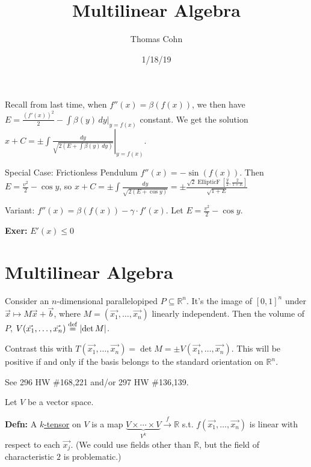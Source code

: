 \documentclass[10pt,letterpaper]{article}
\author{Thomas Cohn}
\title{Multilinear Algebra}
\date{1/18/19} %
\newcommand{\n}{\hfill\break}
\newcommand{\defn}[1]{\par\noindent\settowidth{\hangindent}{\textbf{Defn: }}\textbf{Defn: }#1\n}
\newcommand{\exer}[1]{\par\noindent\settowidth{\hangindent}{\textbf{Exer: }}\textbf{Exer: }#1\n}
\newcommand{\ptxt}[1]{\textrm{\textnormal{#1}}}
\newcommand{\reals}{\mathbb{R}}
\newcommand{\R}{\reals}
\newcommand{\abs}[1]{\left|#1\right|}
\newcommand{\st}{s.t.}
\newcommand{\eqdef}{\overset{\ptxt{def}}{=}}
\renewcommand{\brack}[1]{\left[#1\right]}
\begin{document}
\maketitle
\setlength\RaggedRightParindent{\parindent}
\RaggedRight

\par\noindent Recall from last time, when $f''(x)=\beta(f(x))$, we then have $E=\frac{(f'(x))^{2}}{2}-\int\beta(y)\,dy|_{y=f(x)}$ constant.\n
We get the solution $\displaystyle{}x+C=\left.\pm\int\frac{dy}{\sqrt{2(E+\int\beta(y)\,dy)}}\right|_{y=f(x)}$.\n

\par\noindent Special Case: Frictionless Pendulum\n
$f''(x)=-\sin(f(x))$.\n
Then $E=\frac{v^{2}}{2}-\cos{}y$, so\n
$\displaystyle{}x+C=\pm\int\frac{dy}{\sqrt{2(E+\cos{}y)}}=\pm\frac{\sqrt{2}\operatorname{EllipticF}\brack{\frac{y}{2},\frac{2}{1+E}}}{\sqrt{1+E}}$\n

\par\noindent Variant: $f''(x)=\beta(f(x))-\gamma\cdot{}f'(x)$. Let $E=\frac{v^{2}}{2}-\cos{}y$.\n

\exer{$E'(x)\le{}0$}

\newpage
\section*{Multilinear Algebra}

\par\noindent Consider an $n$-dimensional parallelopiped $P\subseteq\R^{n}$. It's the image of $[0,1]^{n}$ under $\vec{x}\mapsto{}M\vec{x}+\vec{b}$, where $M=(\vec{x_{1}},\ldots,\vec{x_{n}})$ linearly independent. Then the volume of $P$, $V(\vec{x_{1}},\ldots,\vec{x_{n}})\eqdef\abs{\det{M}}$.\n

\par\noindent Contrast this with $T(\vec{x_{1}},\ldots,\vec{x_{n}})=\det{}M=\pm{}V(\vec{x_{1}},\ldots,\vec{x_{n}})$. This will be positive if and only if the basis belongs to the standard orientation on $\R^{n}$.\n

\par\noindent See 296 HW \#168,221 and/or 297 HW \#136,139.\n

\par\noindent Let $V$ be a vector space.\n

\defn{A \underline{$k$-tensor} on $V$ is a map $\underbrace{V\times\cdots\times{}V}_{V^{k}}\overset{f}{\to}\R$ \st{} $f(\vec{x_{1}},\ldots,\vec{x_{n}})$ is linear with respect to each $\vec{x_{j}}$.\n
(We could use fields other than $\R$, but the field of characteristic $2$ is problematic.)}
\end{document}
